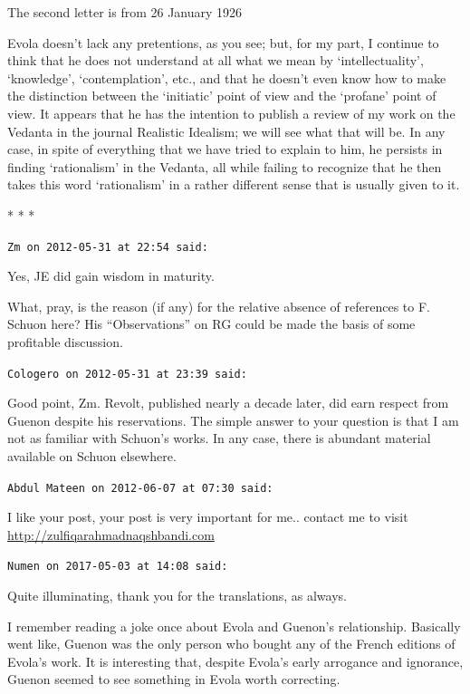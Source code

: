 The second letter is from 26 January 1926

\begin{quotex}
Evola doesn't lack any pretentions, as you see; but, for my part, I continue to think that he does not understand at all what we mean by `intellectuality', `knowledge', `contemplation', etc., and that he doesn't even know how to make the distinction between the `initiatic' point of view and the `profane' point of view. It appears that he has the intention to publish a review of my work on the Vedanta in the journal Realistic Idealism; we will see what that will be. In any case, in spite of everything that we have tried to explain to him, he persists in finding `rationalism' in the Vedanta, all while failing to recognize that he then takes this word `rationalism' in a rather different sense that is usually given to it.
\end{quotex}




\begin{center}* * *\end{center}

\begin{footnotesize}
\begin{sffamily}
\texttt{Zm on 2012-05-31 at 22:54 said:}

Yes, JE did gain wisdom in maturity.

What, pray, is the reason (if any) for the relative absence of references to F. Schuon here? His ``Observations'' on RG could be made the basis of some profitable discussion.

\hfill

\texttt{Cologero on 2012-05-31 at 23:39 said:}

Good point, Zm. Revolt, published nearly a decade later, did earn respect from Guenon despite his reservations. The simple answer to your question is that I am not as familiar with Schuon's works. In any case, there is abundant material available on Schuon elsewhere.

\hfill

\texttt{Abdul Mateen on 2012-06-07 at 07:30 said:}

I like your post, your post is very important for me.. contact me to visit \url{http://zulfiqarahmadnaqshbandi.com}

\hfill

\texttt{Numen on 2017-05-03 at 14:08 said:}

Quite illuminating, thank you for the translations, as always.

I remember reading a joke once about Evola and Guenon's relationship. Basically went like, Guenon was the only person who bought any of the French editions of Evola's work. It is interesting that, despite Evola's early arrogance and ignorance, Guenon seemed to see something in Evola worth correcting.

\end{sffamily}
\end{footnotesize}


